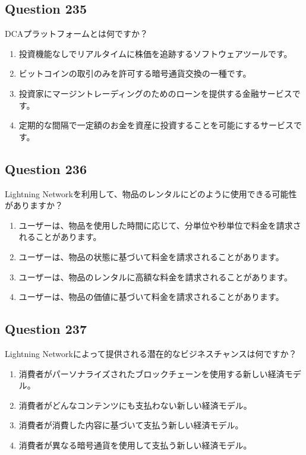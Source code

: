 \documentclass[12pt,a4paper]{article}
\begin{document}
\bigskip


\subsection*{Question 235}
DCAプラットフォームとは何ですか？

\begin{enumerate}[label=\Alph*., leftmargin=*]
\item 投資機能なしでリアルタイムに株価を追跡するソフトウェアツールです。
\item ビットコインの取引のみを許可する暗号通貨交換の一種です。
\item 投資家にマージントレーディングのためのローンを提供する金融サービスです。
\item 定期的な間隔で一定額のお金を資産に投資することを可能にするサービスです。
\end{enumerate}

\bigskip


\subsection*{Question 236}
Lightning Networkを利用して、物品のレンタルにどのように使用できる可能性がありますか？

\begin{enumerate}[label=\Alph*., leftmargin=*]
\item ユーザーは、物品を使用した時間に応じて、分単位や秒単位で料金を請求されることがあります。
\item ユーザーは、物品の状態に基づいて料金を請求されることがあります。
\item ユーザーは、物品のレンタルに高額な料金を請求されることがあります。
\item ユーザーは、物品の価値に基づいて料金を請求されることがあります。
\end{enumerate}

\bigskip


\subsection*{Question 237}
Lightning Networkによって提供される潜在的なビジネスチャンスは何ですか？

\begin{enumerate}[label=\Alph*., leftmargin=*]
\item 消費者がパーソナライズされたブロックチェーンを使用する新しい経済モデル。
\item 消費者がどんなコンテンツにも支払わない新しい経済モデル。
\item 消費者が消費した内容に基づいて支払う新しい経済モデル。
\item 消費者が異なる暗号通貨を使用して支払う新しい経済モデル。
\end{enumerate}
\end{document}
